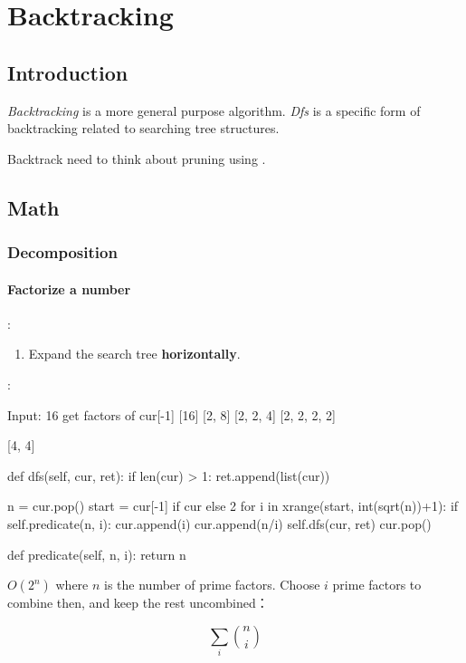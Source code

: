 \chapter{Backtracking}
\section{Introduction}
 \textit{Backtracking} is a more general purpose algorithm. \textit{Dfs} is a specific form of backtracking related to searching tree structures. 

 Backtrack need to think about pruning using .

\section{Math}
\subsection{Decomposition}
\subsubsection{Factorize a number}\label{factorization}
:
\begin{enumerate}
\item Expand the search tree \textbf{horizontally}.
\end{enumerate}
:
\begin{python}
Input: 16
get factors of cur[-1]
[16]
[2, 8]
[2, 2, 4]
[2, 2, 2, 2]

[4, 4]
\end{python}
\begin{python}
def dfs(self, cur, ret):
    if len(cur) > 1:
        ret.append(list(cur))

    n = cur.pop()
    start = cur[-1] if cur else 2
    for i in xrange(start, int(sqrt(n))+1):
        if self.predicate(n, i):
            cur.append(i)
            cur.append(n/i)
            self.dfs(cur, ret)
            cur.pop()
            
def predicate(self, n, i):
  return n%
  
\end{python}
 $O(2^n)$ where $n$ is the number of prime factors. Choose $i$ prime factors to combine then, and keep the rest uncombined： 

$$\sum_i {n \choose i}$$

